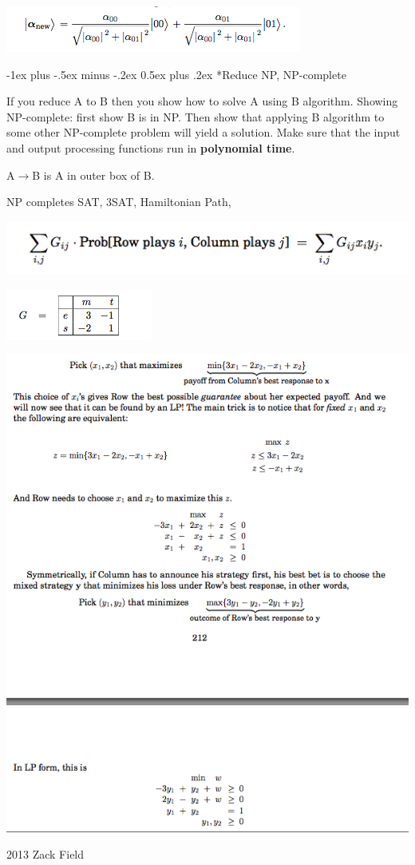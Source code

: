 \documentclass[10pt,landscape]{article}
\makeatletter
\renewcommand{\section}{\@startsection{section}{1}{0mm}%
                                {-1ex plus -.5ex minus -.2ex}%
                                {0.5ex plus .2ex}%
                                {\normalfont\large\bfseries}}
\makeatother
\begin{document}
\begin{multicols}{3}
\includegraphics{qubit.png}


\section*{Reduce NP, NP-complete}

If you reduce A to B then you show how to solve A using B algorithm. Showing
NP-complete: first show B is in NP. Then show that applying B algorithm to
some other NP-complete problem will yield a solution. Make sure that the 
input and output processing functions run in {\bf polynomial time}.

A$\rightarrow$B is A in outer box of B. 

NP completes
SAT, 3SAT, Hamiltonian Path,

\newpage 

\includegraphics[scale=0.5]{zero_sum_1.png}

\includegraphics{zero_sum_2.png}

\includegraphics[scale=0.5]{zero_sum_3.png}


2013 Zack Field


\end{multicols}
\end{document}

